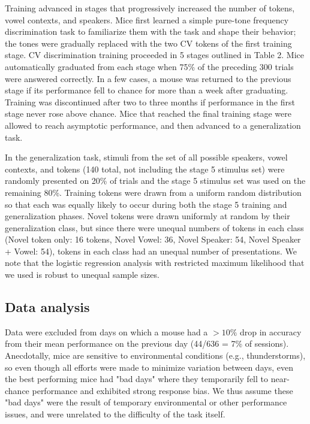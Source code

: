 Training advanced in stages that progressively increased the number of tokens, vowel contexts, and speakers. Mice first learned a simple pure-tone frequency discrimination task to familiarize them with the task and shape their behavior; the tones were gradually replaced with the two CV tokens of the first training stage. CV discrimination training proceeded in 5 stages outlined in Table 2. Mice automatically graduated from each stage when 75\% of the preceding 300 trials were answered correctly. In a few cases, a mouse was returned to the previous stage if its performance fell to chance for more than a week after graduating. Training was discontinued after two to three months if performance in the first stage never rose above chance. Mice that reached the final training stage were allowed to reach asymptotic performance, and then advanced to a generalization task.%

In the generalization task, stimuli from the set of all possible speakers, vowel contexts, and tokens (140 total, not including the stage 5 stimulus set) were randomly presented on 20\% of trials and the stage 5 stimulus set was used on the remaining 80\%. Training tokens were drawn from a uniform random distribution so that each was equally likely to occur during both the stage 5 training and generalization phases. Novel tokens were drawn uniformly at random by their generalization class, but since there were unequal numbers of tokens in each class (Novel token only: 16 tokens, Novel Vowel: 36, Novel Speaker: 54, Novel Speaker + Vowel: 54), tokens in each class had an unequal number of presentations. We note that the logistic regression analysis with restricted maximum likelihood that we used is robust to unequal sample sizes\cite{Patterson1971}.

\subsection{Data analysis}
Data were excluded from days on which a mouse had a $>10\%$ drop in accuracy from their mean performance on the previous day (44/636 = 7\% of sessions). Anecdotally, mice are sensitive to environmental conditions (e.g., thunderstorms), so even though all efforts were made to minimize variation between days, even the best performing mice had "bad days" where they temporarily fell to near-chance performance and exhibited strong response bias. We thus assume these "bad days" were the result of temporary environmental or other performance issues, and were unrelated to the difficulty of the task itself. 

